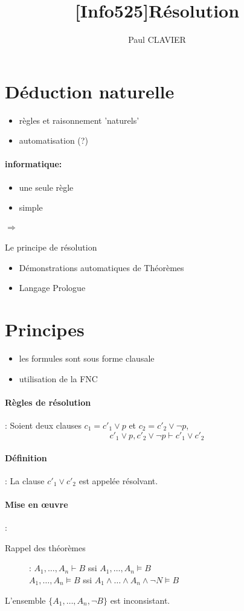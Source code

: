 \documentclass[10pt,a4paper]{article}
\author{Paul CLAVIER}
\title{[Info525]Résolution}
\begin{document}
\maketitle
\newpage
\section{Déduction naturelle}
	\begin{itemize}
		\item règles et raisonnement 'naturels'
		\item automatisation (?)
	\end{itemize}
	\paragraph{informatique:}
	\begin{itemize}
		\item une seule règle
		\item simple
	\end{itemize}
	\paragraph{$\Rightarrow$} Le principe de résolution
	\begin{itemize}
		\item Démonstrations automatiques de Théorèmes
		\item Langage Prologue
	\end{itemize}
\section{Principes}
	\begin{itemize}
		\item les formules sont sous forme clausale
		\item utilisation de la FNC
	\end{itemize}
	\paragraph{Règles de résolution}:
		Soient deux clauses $c_1 = c'_1 \vee p$ et $c_2=c'_2 \vee \neg p$, \[c'_1\vee p, c'_2\vee\neg p \vdash c'_1\vee c'_2\]
	\paragraph{Définition}: La clause $c'_1\vee c'_2$ est appelée résolvant.
	\paragraph{Mise en œuvre}:
		\begin{description}
			\item[Rappel des théorèmes]: $A_1,\ldots, A_n \vdash B$ ssi $A_1,\ldots,A_n \models B$\\
				$A_1,\ldots,A_n \models B$ ssi $A_1 \wedge \ldots \wedge A_n \wedge \neg N \models B$
		\end{description}
		L'ensemble $\{A_1, \ldots, A_n, \neg B\}$ est inconsistant.
\end{document}
